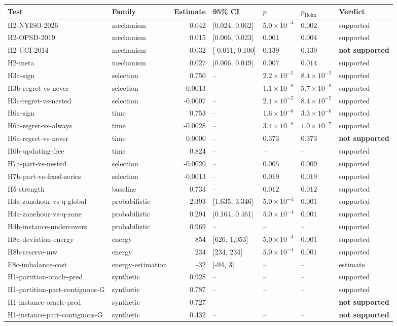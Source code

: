 \begin{tabular}{@{}l l r l l l l@{}}\toprule
Test & Family & Estimate & 95\% CI & $p$ & $p_{\mathrm{Holm}}$ & Verdict \\\midrule
H2-NYISO-2026 & mechanism & 0.042 & [0.024, 0.062] & $5.0\times10^{-4}$ & $0.002$ & supported \\
H2-OPSD-2019 & mechanism & 0.015 & [0.006, 0.023] & $0.001$ & $0.004$ & supported \\
H2-UCI-2014 & mechanism & 0.032 & [-0.011, 0.100] & $0.139$ & $0.139$ & \textbf{not supported} \\
H2-meta & mechanism & 0.027 & [0.006, 0.049] & $0.007$ & $0.014$ & supported \\
H3a-sign & selection & 0.750 & -- & $2.2\times10^{-5}$ & $8.4\times10^{-5}$ & supported \\
H3b-regret-vs-never & selection & -0.0013 & -- & $1.1\times10^{-8}$ & $5.7\times10^{-8}$ & supported \\
H3c-regret-vs-nested & selection & -0.0007 & -- & $2.1\times10^{-5}$ & $8.4\times10^{-5}$ & supported \\
H6a-sign & time & 0.753 & -- & $1.6\times10^{-6}$ & $3.3\times10^{-6}$ & supported \\
H6a-regret-vs-always & time & -0.0028 & -- & $3.4\times10^{-8}$ & $1.0\times10^{-7}$ & supported \\
H6a-regret-vs-never & time & 0.0000 & -- & $0.373$ & $0.373$ & \textbf{not supported} \\
H6b-updating-free & time & 0.824 & -- & -- & -- & supported \\
H7a-part-vs-nested & selection & -0.0020 & -- & $0.005$ & $0.009$ & supported \\
H7b-part-vs-fixed-series & selection & -0.0013 & -- & $0.019$ & $0.019$ & supported \\
H5-strength & baseline & 0.733 & -- & $0.012$ & $0.012$ & supported \\
H4a-zonehour-vs-q-global & probabilistic & 2.393 & [1.635, 3.346] & $5.0\times10^{-4}$ & $0.001$ & supported \\
H4a-zonehour-vs-q-zone & probabilistic & 0.294 & [0.164, 0.461] & $5.0\times10^{-4}$ & $0.001$ & supported \\
H4b-instance-undercovers & probabilistic & 0.969 & -- & -- & -- & supported \\
H8a-deviation-energy & energy & 854 & [626, 1,053] & $5.0\times10^{-4}$ & $0.001$ & supported \\
H8b-reserve-mw & energy & 234 & [234, 234] & $5.0\times10^{-4}$ & $0.001$ & supported \\
E8c-imbalance-cost & energy-estimation & -32 & [-94, 3] & -- & -- & estimate \\
H1-partition-oracle-pred & synthetic & 0.928 & -- & -- & -- & supported \\
H1-partition-part-contiguous-G & synthetic & 0.787 & -- & -- & -- & supported \\
H1-instance-oracle-pred & synthetic & 0.727 & -- & -- & -- & \textbf{not supported} \\
H1-instance-part-contiguous-G & synthetic & 0.432 & -- & -- & -- & \textbf{not supported} \\
\bottomrule\end{tabular}
